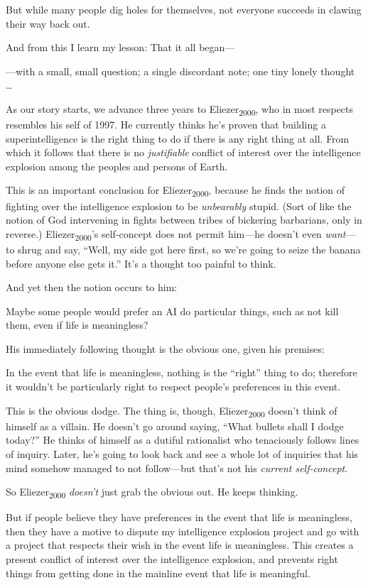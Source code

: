 {
 But while many people dig holes for themselves, not everyone
succeeds in clawing their way back out.}

{
 And from this I learn my lesson: That it all began---}

{
 {}---with a small, small question; a single discordant note; one
tiny lonely thought \ldots}

{
 As our story starts, we advance three years to
Eliezer\textsubscript{2000}, who in most respects resembles his self of
1997. He currently thinks he's proven that building a
superintelligence is the right thing to do if there is any right thing
at all. From which it follows that there is no \textit{justifiable}
conflict of interest over the intelligence explosion among the peoples
and persons of Earth.}

{
 This is an important conclusion for Eliezer\textsubscript{2000},
because he finds the notion of fighting over the intelligence explosion
to be \textit{unbearably} stupid. (Sort of like the notion of God
intervening in fights between tribes of bickering barbarians, only in
reverse.) Eliezer\textsubscript{2000}'s self-concept
does not permit him---he doesn't even
\textit{want}{}---to shrug and say, ``Well, my side
got here first, so we're going to seize the banana
before anyone else gets it.'' It's a
thought too painful to think.}

{
 And yet then the notion occurs to him:}

{
 Maybe some people would prefer an AI do particular things, such as
not kill them, even if life is meaningless?}

{
 His immediately following thought is the obvious one, given his
premises:}

{
 In the event that life is meaningless, nothing is the
``right'' thing to do; therefore it
wouldn't be particularly right to respect
people's preferences in this event.}

{
 This is the obvious dodge. The thing is, though,
Eliezer\textsubscript{2000} doesn't think of himself as
a villain. He doesn't go around saying,
``What bullets shall I dodge
today?'' He thinks of himself as a dutiful
rationalist who tenaciously follows lines of inquiry. Later,
he's going to look back and see a whole lot of
inquiries that his mind somehow managed to not follow---but
that's not his \textit{current self-concept}.}

{
 So Eliezer\textsubscript{2000} \textit{doesn't}
just grab the obvious out. He keeps thinking.}

{
 But if people believe they have preferences in the event that life
is meaningless, then they have a motive to dispute my intelligence
explosion project and go with a project that respects their wish in the
event life is meaningless. This creates a present conflict of interest
over the intelligence explosion, and prevents right things from getting
done in the mainline event that life is meaningful.}

